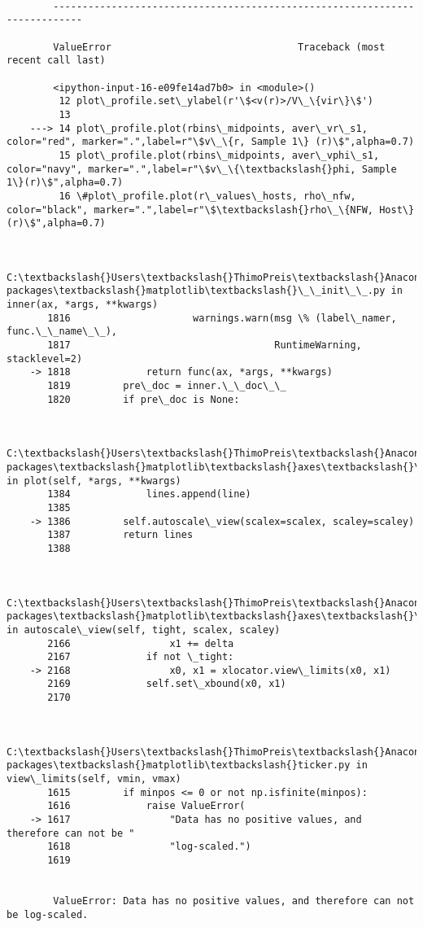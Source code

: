 \documentclass[11pt]{article}
\begin{document}
    \begin{Verbatim}[commandchars=\\\{\}]

        ---------------------------------------------------------------------------

        ValueError                                Traceback (most recent call last)

        <ipython-input-16-e09fe14ad7b0> in <module>()
         12 plot\_profile.set\_ylabel(r'\$<v(r)>/V\_\{vir\}\$')
         13 
    ---> 14 plot\_profile.plot(rbins\_midpoints, aver\_vr\_s1, color="red", marker=".",label=r"\$v\_\{r, Sample 1\} (r)\$",alpha=0.7)
         15 plot\_profile.plot(rbins\_midpoints, aver\_vphi\_s1, color="navy", marker=".",label=r"\$v\_\{\textbackslash{}phi, Sample 1\}(r)\$",alpha=0.7)
         16 \#plot\_profile.plot(r\_values\_hosts, rho\_nfw, color="black", marker=".",label=r"\$\textbackslash{}rho\_\{NFW, Host\}(r)\$",alpha=0.7)
    

        C:\textbackslash{}Users\textbackslash{}ThimoPreis\textbackslash{}Anaconda3\textbackslash{}lib\textbackslash{}site-packages\textbackslash{}matplotlib\textbackslash{}\_\_init\_\_.py in inner(ax, *args, **kwargs)
       1816                     warnings.warn(msg \% (label\_namer, func.\_\_name\_\_),
       1817                                   RuntimeWarning, stacklevel=2)
    -> 1818             return func(ax, *args, **kwargs)
       1819         pre\_doc = inner.\_\_doc\_\_
       1820         if pre\_doc is None:
    

        C:\textbackslash{}Users\textbackslash{}ThimoPreis\textbackslash{}Anaconda3\textbackslash{}lib\textbackslash{}site-packages\textbackslash{}matplotlib\textbackslash{}axes\textbackslash{}\_axes.py in plot(self, *args, **kwargs)
       1384             lines.append(line)
       1385 
    -> 1386         self.autoscale\_view(scalex=scalex, scaley=scaley)
       1387         return lines
       1388 
    

        C:\textbackslash{}Users\textbackslash{}ThimoPreis\textbackslash{}Anaconda3\textbackslash{}lib\textbackslash{}site-packages\textbackslash{}matplotlib\textbackslash{}axes\textbackslash{}\_base.py in autoscale\_view(self, tight, scalex, scaley)
       2166                 x1 += delta
       2167             if not \_tight:
    -> 2168                 x0, x1 = xlocator.view\_limits(x0, x1)
       2169             self.set\_xbound(x0, x1)
       2170 
    

        C:\textbackslash{}Users\textbackslash{}ThimoPreis\textbackslash{}Anaconda3\textbackslash{}lib\textbackslash{}site-packages\textbackslash{}matplotlib\textbackslash{}ticker.py in view\_limits(self, vmin, vmax)
       1615         if minpos <= 0 or not np.isfinite(minpos):
       1616             raise ValueError(
    -> 1617                 "Data has no positive values, and therefore can not be "
       1618                 "log-scaled.")
       1619 
    

        ValueError: Data has no positive values, and therefore can not be log-scaled.

    \end{Verbatim}
\end{document}
